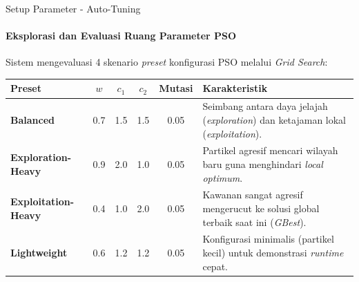 \documentclass[aspectratio=169,10pt]{beamer}
\begin{document}
\begin{frame}{Setup Parameter - Auto-Tuning}
  \framesubtitle{Eksplorasi dan Evaluasi Ruang Parameter PSO}
  Sistem mengevaluasi 4 skenario \textit{preset} konfigurasi PSO melalui \textit{Grid Search}:
  
  \vspace{0.2cm}
  \begin{table}[]
    \centering\footnotesize
    \begin{tabular}{@{}lccccp{4.7cm}@{}}
      \toprule
      \textbf{Preset} & $w$ & $c_1$ & $c_2$ & \textbf{Mutasi} & \textbf{Karakteristik} \\
      \midrule
      \textbf{Balanced} & 0.7 & 1.5 & 1.5 & 0.05 & Seimbang antara daya jelajah (\textit{exploration}) dan ketajaman lokal (\textit{exploitation}).\\
      \addlinespace
      \textbf{Exploration-Heavy} & 0.9 & 2.0 & 1.0 & 0.05 & Partikel agresif mencari wilayah baru guna menghindari \textit{local optimum}.\\
      \addlinespace
      \textbf{Exploitation-Heavy} & 0.4 & 1.0 & 2.0 & 0.05 & Kawanan sangat agresif mengerucut ke solusi global terbaik saat ini (\textit{GBest}).\\
      \addlinespace
      \textbf{Lightweight} & 0.6 & 1.2 & 1.2 & 0.05 & Konfigurasi minimalis (partikel kecil) untuk demonstrasi \textit{runtime} cepat.\\
      \bottomrule
    \end{tabular}
  \end{table}
\end{frame}
\end{document}
